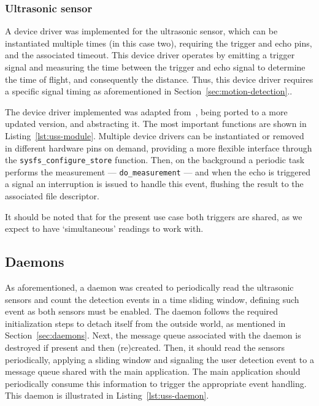 

\subsubsection{Ultrasonic sensor}
\label{sec:ultrasonic-sensor}
A device driver was implemented for the ultrasonic sensor, which can be
instantiated multiple times (in this case two), requiring the trigger and echo
pins, and the associated timeout. This device driver operates by emitting a
trigger signal and measuring the time between the trigger and echo signal to
determine the time of flight, and consequently the distance. Thus, this device
driver requires a specific signal timing as aforementioned in
Section~\ref{sec:motion-detection}..

The device driver implemented was adapted
from~\cite{hc-sro4-dd}, being ported to a more updated version, and abstracting
it. The most important functions are shown in
Listing~\ref{lst:uss-module}. Multiple device drivers can be instantiated or
removed in different hardware pins on demand, providing a more flexible
interface through the \texttt{sysfs\_configure\_store} function.
Then, on the background a periodic task performs the measurement ---
\texttt{do\_measurement} --- and when the echo is triggered a signal an
interruption is issued to handle this event, flushing the result to the
associated file descriptor.

It should be noted that for the present use case both triggers are shared,
as we expect to have `simultaneous' readings to work with.



\subsection{Daemons}
\label{sec:daemons-1}
As aforementioned, a daemon was created to periodically read the ultrasonic
sensors and count the detection events in a time sliding window, defining such
event as both sensors must be enabled. The daemon follows the required
initialization steps to detach itself from the outside world, as mentioned in
Section~\ref{sec:daemons}. Next, the message queue associated with the daemon is destroyed if present and
then (re)created.
Then, it should read the sensors periodically,
applying a sliding window and signaling the user detection event to a message
queue shared with the main application. The main application should periodically
consume this information to trigger the appropriate event handling. This daemon
is illustrated in Listing~\ref{lst:uss-daemon}.


